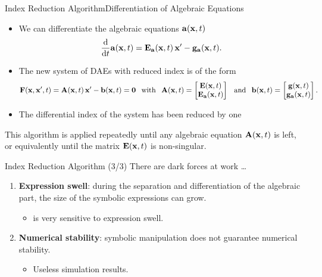 \begin{frame}{Index Reduction Algorithm}{Differentiation of Algebraic Equations}
  \begin{itemize}
    \item We can differentiate the algebraic equations $\mathbf{a}(\mathbf{x}, t)$
    \begin{equation*}
      \dfrac{\mathrm{d}}{\mathrm{d}t} \mathbf{a}(\mathbf{x}, t) = \mathbf{E}_{\mathbf{a}}(\mathbf{x}, t) \, \mathbf{x}^\prime - \mathbf{g}_{\mathbf{a}}(\mathbf{x}, t) \text{.}
    \end{equation*}
    \item The new system of \acp{DAE} with reduced index is of the form
    \begin{align*}
      \mathbf{F}(\mathbf{x}, \mathbf{x}^\prime, t) = \mathbf{A}(\mathbf{x}, t) \, \mathbf{x}^\prime - \mathbf{b}(\mathbf{x}, t) = \mathbf{0}
      \hspace{0.75em} \text{with} \hspace{0.75em}
      \mathbf{A}(\mathbf{x}, t) = \begin{bmatrix} \mathbf{E}(\mathbf{x}, t) \\ \mathbf{E}_{\mathbf{a}}(\mathbf{x}, t) \end{bmatrix}
      \hspace{0.75em} \text{and} \hspace{0.75em}
      \mathbf{b}(\mathbf{x}, t) = \begin{bmatrix} \mathbf{g}(\mathbf{x}, t) \\ \mathbf{g}_{\mathbf{a}}(\mathbf{x}, t) \end{bmatrix} \text{.}
    \end{align*}
    \item The differential index of the system has been reduced by one
  \end{itemize}
  \begin{bbox}
    This algorithm is applied repeatedly until any algebraic equation $\mathbf{A}(\mathbf{x}, t)$ is left, or equivalently until the matrix $\mathbf{E}(\mathbf{x}, t)$ is non-singular.
  \end{bbox}
\end{frame}

\begin{frame}{Index Reduction Algorithm (3/3)}
  There are dark forces at work \dots
  \begin{enumerate}
    \item \textbf{Expression swell}: during the separation and differentiation of the algebraic part, the size of the symbolic expressions can grow.
    \begin{itemize}
      \item \Maple{} is very sensitive to expression swell.
    \end{itemize}
    \item \textbf{Numerical stability}: symbolic manipulation does not guarantee numerical stability.
    \begin{itemize}
      \item Useless simulation results.
    \end{itemize}
    \end{enumerate}
\end{frame}

\begin{frame}
  \tableofcontents[currentsection]
\end{frame}

